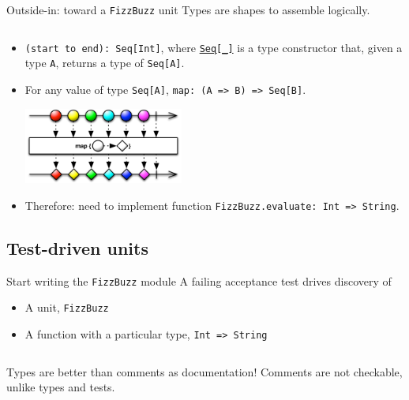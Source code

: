 \begin{frame}[fragile]{Outside-in: toward a \texttt{FizzBuzz} unit}
  Types are shapes to assemble logically.

  \inputminted{scala}{Main4.scala}

  \begin{itemize}
  \item \texttt{(start to end): Seq[Int]}, where \href{http://www.scala-lang.org/api/2.11.0/index.html\#scala.collection.Seq}{\texttt{Seq[_]}} is a \alert{type constructor} that, given a type \texttt{A}, returns a type of \texttt{Seq[A]}.
    \pause
  \item For any value of type \texttt{Seq[A]}, \texttt{map: (A => B) => Seq[B]}.
  \begin{center}
    \includegraphics[height=2.5cm]{map.png}
  \end{center}
  \pause
  \item Therefore: need to implement function \texttt{FizzBuzz.evaluate: Int => String}.
  \end{itemize}
\end{frame}

\subsection{Test-driven units}

\begin{frame}[fragile]{Start writing the \texttt{FizzBuzz} module}
  A failing acceptance test drives \alert{discovery} of
  \begin{itemize}
  \item A \alert{unit}, \texttt{FizzBuzz}
  \item A function with a particular type,
    \texttt{Int => String}
  \end{itemize}

  \inputminted{scala}{FizzBuzz1.scala}

  \begin{block}{\alert{Types} are better than \alert{comments} as \alert{documentation}!}
    Comments are not checkable, unlike types and tests.
  \end{block}
\end{frame}

